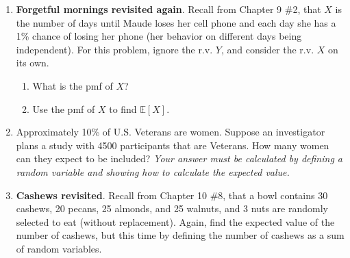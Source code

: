 \documentclass[12pt]{article}
\begin{document}
\begin{enumerate}

\item  \label{Ch10_Ch9_Nmbr2_expected_value} \textbf{Forgetful mornings revisited again}.
Recall from Chapter 9 \#2, that $X$ is the number of days until Maude loses her cell phone and each day she has a 1\% chance of losing her phone (her behavior on different days being independent). For this problem, ignore the r.v. $Y$, and consider the r.v. $X$ on its own.
	\begin{enumerate}
     \item What is the pmf of $X$?
     \item Use the pmf of $X$ to find $\mathbb{E}[X]$.
	\end{enumerate}





\item  \label{Ch11_E_Binomial_Female_Vets}
Approximately 10\% of U.S. Veterans are women. Suppose an investigator plans a study with 4500 participants that are Veterans. How many women can they expect to be included? \textit{Your answer must be calculated by defining a random variable and showing how to calculate the expected value.}

\item  \label{Ch11_Ch10_Nmbr8_expected_value_Hypergeo} \textbf{Cashews revisited}.
Recall from Chapter 10 \#8, that a bowl contains 30 cashews, 20 pecans, 25 almonds, and 25 walnuts, and 3 nuts are randomly selected to eat (without replacement). Again, find the expected value of the number of cashews, but this time by defining the number of cashews as a sum of random variables. 




\end{enumerate}
\end{document}
